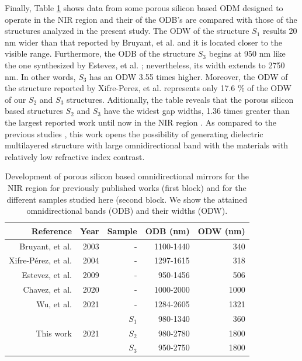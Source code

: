 \documentclass[a4paper,fleqn]{cas-sc}
\begin{document}
Finally, Table \ref{tab:table3} shows data from some porous
silicon based ODM designed to operate in the NIR
region and their of the ODB's are compared with those of
the structures analyzed in the present study. The ODW
of the structure $S_1$ results 20 nm wider than that reported by Bruyant,
et al. \cite{Bruyant2003} and it is located closer to the visible range. Furthermore,
the ODB of the structure $S_3$ begins at 950 nm like the one
synthesized by Estevez, et al. \cite{Estevez2009}; nevertheless, its width extends to 2750
nm. In other words, $S_3$ has an ODW 3.55 times higher. Moreover, the
ODW of the structure reported by Xifre-Perez, et al. \cite{Xifre2005} represents only 17.6
\% of the ODW of our $S_2$ and $S_3$ structures. Aditionally, the table
reveals that the porous silicon based
structures $S_2$ and $S_3$ have the widest gap widths, 1.36 times greater than the
largest reported work until now in the NIR region \cite{Wu2021}.
As compared to the previous studies \cite{Bruyant2003,Estevez2009,Xifre2005,Wu2021,Fink1998}, this work
opens the possibility of generating dielectric multilayered
structure with large omnidirectional band with
the materials with relatively low refractive index contrast.

\begin{table}
        \centering
        \label{tab:table3}
        \begin{tabular}{rrrrr}
                Reference&Year&Sample&ODB (nm)&ODW (nm)\\
                \hline
                \hline
                Bruyant, et al. \cite{Bruyant2003}      &2003&-    &1100-1440&340\\
                Xifre-P\'{e}rez, et al. \cite{Xifre2005}&2004&-    &1297-1615&318\\
                Estevez, et al. \cite{Estevez2009}      &2009&-    &950-1456 &506\\
                Chavez, et al. \cite{Chavez2020}        &2020&-    &1000-2000&1000\\
                Wu, et al. \cite{Wu2021}                &2021&-    &1284-2605&1321\\
                \hline
                &    &$S_1$&980-1340&360 \\
                This work                               &2021&$S_2$&980-2780&1800\\
                &    &$S_3$&950-2750&1800\\
        \end{tabular}
        \caption{Development of porous silicon based omnidirectional mirrors for the NIR region for
                previously published works (first block) and for the different samples studied here (second
                block. We show the attained omnidirectional bands (ODB) and their widths (ODW).}
\end{table}
\end{document}
